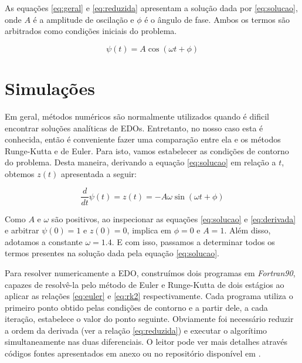 \documentclass[
		12pt,            %
		a4paper
	      ]  
	      {article}          %
\begin{document}
	As equações \ref{eq:geral} e \ref{eq:reduzida} apresentam a solução dada por \ref{eq:solucao}, onde 
	$A$ é a amplitude de oscilação e $\phi$ é o ângulo de fase. Ambos os termos são arbitrados como
	condições iniciais do problema.

	\vspace{-10mm}
	\begin{equation}\label{eq:solucao}
		\psi(t)=A\cos(\omega t + \phi)
	\end{equation}
	\vspace{-15mm}

	\section{Simulações}

	Em geral, métodos numéricos são normalmente utilizados quando é dificil encontrar soluções analíticas 
	de EDOs. Entretanto, no nosso caso esta é conhecida, então é  conveniente fazer uma comparação entre ela 
	e os métodos Runge-Kutta e de Euler. Para isto, vamos estabelecer as condições de contorno do problema. 
	Desta maneira, derivando a equação \ref{eq:solucao} em relação a $t$, obtemos $z(t)$ apresentada a seguir:
	
	\vspace{-5mm}
	\begin{equation}\label{eq:derivada}
		\frac{d}{dt}\psi(t)= z(t) = -A \omega \sin(\omega t + \phi)
	\end{equation}

	Como $A$ e $\omega$ são positivos, ao inspecionar as equações \ref{eq:solucao} e \ref{eq:derivada} 
	e arbitrar $\psi(0) = 1$ e $z(0) = 0$, implica em $\phi = 0$ e $A = 1$. Além disso, adotamos a constante 
	$\omega = 1.4$. E com isso, passamos a determinar todos os termos presentes na solução dada pela equação 
	\ref{eq:solucao}.\par
	
	Para resolver numericamente a EDO, construímos dois programas em {\it Fortran90}, capazes de resolvê-la 
	pelo método de Euler e Runge-Kutta de dois estágios ao aplicar as relações \ref{eq:euler} e \ref{eq:rk2} 
	respectivamente. Cada programa utiliza o primeiro ponto obtido pelas condições de contorno e a partir dele, 
	a cada iteração, estabelece o valor do ponto seguinte. Obviamente foi necessário reduzir a ordem da derivada 
	(ver a relação \ref{eq:reduzida}) e executar o algorítimo simultaneamente nas duas diferenciais. O leitor 
	pode ver mais detalhes através códigos fontes apresentados em anexo ou no repositório disponível em \cite{projeto}.
	
\end{document}
